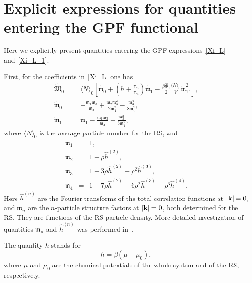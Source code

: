 \section{\label{sec:app-a} Explicit expressions for quantities entering the GPF functional}
Here we explicitly present quantities entering the GPF expressions~\eqref{Xi_L} and~\eqref{Xi_L_1}.

First, for the coefficients in~\eqref{Xi_L} one has
\begin{eqnarray*}
	\label{tilde_frak_M0}
	\tilde{\mathfrak M}_0 & = & \langle N \rangle_0 
	\left[
		\tilde{\mathfrak{m}}_0
		+ \left(h + \frac{\mathfrak{m}_3}{\mathfrak{m}_4} \right) \tilde{\mathfrak{m}}_1
		- \frac{\beta \hat{\Phi}_0}{2}\frac{\langle N \rangle_0}{V} \tilde{\mathfrak{m}}_1^2.
	\right],
\\
	\tilde{\mathfrak{m}}_0 & = & -\frac{\mathfrak{m}_1 \mathfrak{m}_3}{\mathfrak{m}_4} + \frac{\mathfrak{m}_2 \mathfrak{m}^2_3}{2 \mathfrak{m}_4^2} - \frac{\mathfrak{m}_3^4}{8\mathfrak{m}_4^2},
\\
	\tilde{\mathfrak{m}}_1 & = & \mathfrak{m}_1 - \frac{\mathfrak{m}_2 \mathfrak{m}_3}{\mathfrak{m}_4} + \frac{\mathfrak{m}_3^3}{3\mathfrak{m}_4^2},
\end{eqnarray*}
where $\langle N \rangle_0$ is the average particle number for the RS, and
\begin{eqnarray*}
	\mathfrak{m}_1 & = & 1,
	\\
	\mathfrak{m}_2 & = & 1 + \rho \hat{h}^{(2)},
	\\
	\mathfrak{m}_3 & = & 1 + 3\rho \hat{h}^{(2)} + \rho^2 \hat{h}^{(3)},
	\\
	\mathfrak{m}_4 & = & 1 + 7\rho \hat{h}^{(2)} + 6\rho^2 \hat{h}^{(3)} + \rho^3 \hat{h}^{(4)}.
\end{eqnarray*}
Here $\hat{h}^{(n)}$ are the Fourier transforms of the total correlation functions at $\abs{\vb k} = 0,$ and $\mathfrak{m}_n$ are the $n$-particle structure factors at $\abs{\vb k} = 0$, both determined for the RS. They are functions of the RS particle density. More detailed investigation of quantities $\mathfrak{m}_n$ and $\hat{h}^{(n)}$ was performed in~\cite{RomaJPS2024,Roma2023Preprint}.

The quantity $h$ stands for
\begin{equation*}
	h = \beta(\mu - \mu_0),
\end{equation*}
where $\mu$ and $\mu_0$ are the chemical potentials of the whole system and of the RS, respectively.

